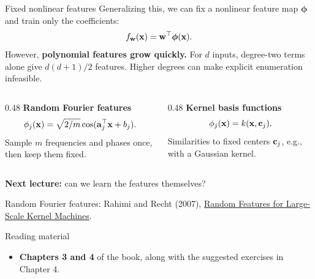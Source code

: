\documentclass[12pt,aspectratio=169]{beamer}
\begin{document}
\begin{frame}{Fixed nonlinear features}
	\small
	\setlength{\parskip}{2pt}
	\setlength{\abovedisplayskip}{4pt}\setlength{\belowdisplayskip}{4pt}
	Generalizing this, we can fix a nonlinear feature map $\boldsymbol{\phi}$ and train only the coefficients:
	\[
		f_{\boldsymbol{\mathbf{w}}}(\boldsymbol{\mathbf{x}})=\boldsymbol{\mathbf{w}}^{\top}\boldsymbol{\phi}(\boldsymbol{\mathbf{x}}).
	\]
	\smallskip
	However, \textbf{polynomial features grow quickly.} For $d$ inputs, degree-two terms alone
	give $d(d+1)/2$ features. Higher degrees can make explicit enumeration infeasible.

	\smallskip
	\begin{columns}[T,onlytextwidth]
		\begin{column}{0.48\textwidth}
			\textbf{\color{darkcerulean}Random Fourier features}
			\[
				\phi_j(\boldsymbol{\mathbf{x}})=\sqrt{2/m}\cos(\boldsymbol{\mathbf{a}}_j^{\top}\boldsymbol{\mathbf{x}}+b_j).
			\]
			Sample $m$ frequencies and phases once, then keep them fixed.
		\end{column}
		\begin{column}{0.48\textwidth}
			\textbf{\color{darkcerulean}Kernel basis functions}
			\[
				\phi_j(\boldsymbol{\mathbf{x}})=k(\boldsymbol{\mathbf{x}},\boldsymbol{\mathbf{c}}_j).
			\]
			Similarities to fixed centers $\boldsymbol{\mathbf{c}}_j$, e.g., with a Gaussian kernel.
		\end{column}
	\end{columns}

	\smallskip
	\begin{tcolorbox}[nndsgreen,boxsep=1mm,top=1mm,bottom=1mm]
		\textbf{Next lecture:} can we learn the features themselves?
	\end{tcolorbox}
	{\scriptsize\color{drawgray}Random Fourier features: Rahimi and Recht (2007),
	\href{https://papers.nips.cc/paper/2007/hash/013a006f03dbc5392effeb8f18fda755-Abstract.html}{Random Features for Large-Scale Kernel Machines}.}
\end{frame}

\begin{frame}{Reading material}
	
	\begin{itemize}
		\item \textbf{Chapters 3 and 4} of the book, along with the suggested exercises in Chapter 4.
	\end{itemize}
	
\end{frame}
\end{document}
